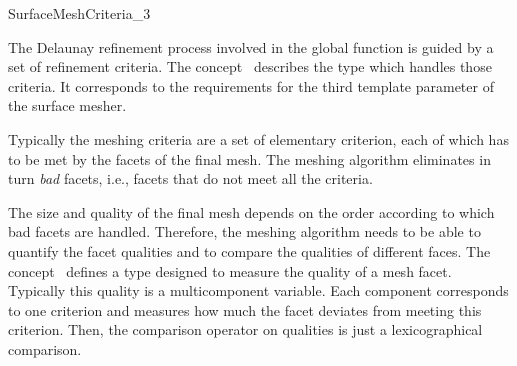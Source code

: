 

\begin{ccRefConcept}{SurfaceMeshCriteria_3}

\ccDefinition
  
The Delaunay refinement process involved in  the 
global function  
is guided by a set of refinement criteria.
The concept \ccRefName\ describes the type  which
handles those criteria. 
It corresponds to the requirements for the third template parameter
 of the surface mesher.

Typically the meshing criteria are a set
of elementary criterion, each of which
has to be met by  the facets of the final mesh.
The meshing algorithm eliminates in turn  {\em bad} facets, i.e.,
facets that do not meet all the criteria.

The size and quality of the final mesh 
depends on the order according to which bad facets
are handled. Therefore, the meshing algorithm 
needs to be able to quantify the facet qualities and to compare
the qualities of different faces.
The concept \ccRefName\ 
defines a type  designed to measure
the quality of a mesh facet. 
Typically this quality
is a multicomponent variable.  Each component corresponds to
one criterion and measures how much the facet deviates from
meeting this criterion. Then, the  comparison operator on qualities
is just a lexicographical comparison.

\ccHasModel


\end{ccRefConcept}


